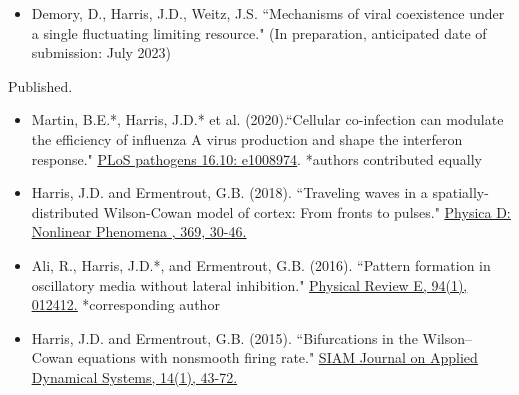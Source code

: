 \documentclass[a4paper,10pt]{article}
\newlength{\cvcolumngapwidth}
\newlength{\cvleftcolumnwidth}
\newlength{\cvrightcolumnwidth}
\newcommand{\cvtitlestyle}[1]{{\large\cvtitlefont\textcolor{cvtitlecolor}{#1}}}
\newcommand{\cvdurationstyle}[1]{{\small\cvdurationfont\textcolor{cvdurationcolor}{#1}}}
\newlength{\cvafteritemskipamount}
\newlength{\cvaftertitleskipamount}
\newlength{\cvparskip}
\newcommand{\cvitem}[2]{
            \begin{minipage}[t]{\cvleftcolumnwidth}
                \raggedleft #1
            \end{minipage}%
            \hspace{\cvcolumngapwidth}%
            \begin{minipage}[t]{\cvrightcolumnwidth}
                \setlength{\parskip}{\cvparskip} #2
            \end{minipage}
        
            \vspace{\cvafteritemskipamount}
        }
\newcommand{\cvtitle}[1]{
            \cvtitlestyle{#1}
        
            \vspace{\cvaftertitleskipamount}
            \vspace{-\cvparskip}
        }
\begin{document}
	
        \cvitem{
            \cvdurationstyle{}
        }{	
        	\newpage
	            \begin{itemize}[leftmargin=*]

	


	\item Demory, D., Harris, J.D., Weitz, J.S. ``Mechanisms of viral coexistence under a single fluctuating limiting resource." (In preparation, anticipated date of submission: July 2023)	
			
            \end{itemize}
        }
        
        
        \cvitem{
            \cvdurationstyle{Published.}
        }{
            \begin{itemize}[leftmargin=*]
                	\item Martin, B.E.*, Harris, J.D.* et al. (2020).``Cellular co-infection can modulate the efficiency of influenza A virus production and shape the interferon response." \href{https://doi.org/10.1371/journal.ppat.1008974}{\underline{PLoS pathogens 16.10: e1008974}}. *authors contributed equally \\
	
        	        \item  Harris, J.D. and Ermentrout, G.B. (2018). ``Traveling waves in a spatially-distributed Wilson-Cowan model of cortex: From fronts to pulses." \href{https://doi.org/10.1016/j.physd.2017.12.011}{\underline{Physica D: Nonlinear Phenomena , 369, 30-46.}}
            \end{itemize}
        }    	
        \cvitem{
            \cvdurationstyle{}
        }{	
        	\newpage
        \begin{itemize}[leftmargin=*]	
                \item Ali, R., Harris, J.D.*, and Ermentrout, G.B. (2016). ``Pattern formation in oscillatory media without lateral inhibition." \href{https://doi.org/10.1103/PhysRevE.94.012412}{\underline{Physical Review E, 94(1), 012412.}}  *corresponding author \\ 
                \item Harris, J.D. and Ermentrout, G.B. (2015). ``Bifurcations in the Wilson--Cowan equations with nonsmooth firing rate." \href{https://doi.org/10.1137/140977953}{\underline{SIAM Journal on Applied Dynamical Systems, 14(1), 43-72. }}
            \end{itemize}
        
        }
        
\end{document}
